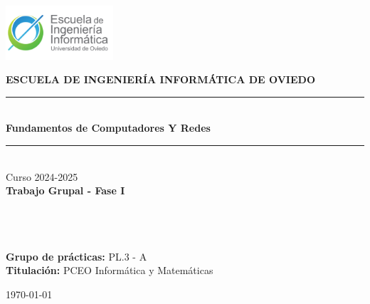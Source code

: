 \documentclass[11pt,a4paper]{article}
\begin{document}
\begin{titlepage}
    \begin{center}
        \includegraphics[width=0.3\textwidth]{logo_escuela.png} \\[1cm] %
        \vspace{1cm}
        
        \textbf{\LARGE ESCUELA DE INGENIERÍA INFORMÁTICA DE OVIEDO} \\[1.5cm]
        
        \rule{\linewidth}{0.5mm} \\[0.4cm]
        \textbf{\Huge Fundamentos de Computadores Y Redes} \\[0.3cm]
        \rule{\linewidth}{0.5mm} \\[1cm]
        
        {\Large Curso 2024-2025} \\[1.5cm]
        
        \textbf{\LARGE Trabajo Grupal - Fase I} \\[0.8cm]
        
        \\[0.15cm]
        \\[0.15cm]
        \\[0.15cm]
        
        \vfill
        
        \begin{flushright}
            \textbf{Grupo de prácticas:} PL.3 - A \\[0.3cm]
            \textbf{Titulación:} PCEO Informática y Matemáticas \\[0.3cm]
        \end{flushright}
        
        \vfill
        
        \today \\[1cm]
    \end{center}
  \end{titlepage}
\end{document}
